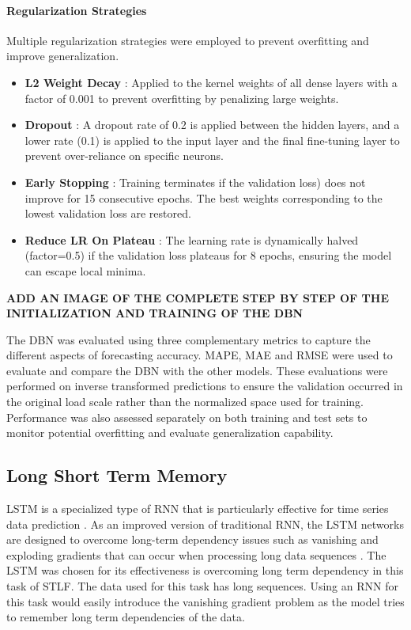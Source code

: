  \paragraph{Regularization Strategies}
 Multiple regularization strategies were employed to prevent overfitting and improve generalization.
 
 \begin{itemize}
 	\item \textbf{L2 Weight Decay} : Applied to the kernel weights of all dense layers with a factor of 0.001 to prevent overfitting by penalizing large weights.
 	\item \textbf{Dropout} : A dropout rate of 0.2 is applied between the hidden layers, and a lower rate (0.1) is applied to the input layer and the final fine-tuning layer to prevent over-reliance on specific neurons.
 	\item \textbf{Early Stopping} : Training terminates if the validation loss) does not improve for 15 consecutive epochs. The best weights corresponding to the lowest validation loss are restored.
 	\item \textbf{Reduce LR On Plateau} : The learning rate is dynamically halved (factor=0.5) if the validation loss plateaus for 8 epochs, ensuring the model can escape local minima.
 \end{itemize}
 
 \textbf{ ADD AN IMAGE OF THE COMPLETE STEP BY STEP OF THE INITIALIZATION AND TRAINING OF THE DBN}
 
 
 The DBN was evaluated using three complementary metrics to capture the different aspects of forecasting accuracy. MAPE, MAE and RMSE were used to evaluate and compare the DBN with the other models. These evaluations were performed on inverse transformed predictions to ensure the validation occurred in the original load scale rather than the normalized space used for training. Performance was also assessed separately on both training and test sets to monitor potential overfitting and evaluate generalization capability.
 
 
 
 \subsection{Long Short Term Memory}
 
 LSTM is a specialized type of RNN that is particularly effective for time series data prediction \cite{rafi2021short}
 . As an improved version of traditional RNN, the LSTM networks are designed to overcome long-term dependency issues such as vanishing and exploding gradients that can occur when processing long data sequences \cite{boopathy2024deep}. The LSTM was chosen for its effectiveness is overcoming long term dependency in this task of STLF. The data used for this task has long sequences. Using an RNN for this task would easily introduce the vanishing gradient problem as the model tries to remember long term dependencies of the data.
 
